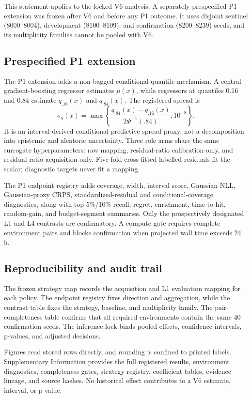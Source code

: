 \documentclass[10pt]{article}
\begin{document}
This statement applies to the locked V6 analysis. A separately prespecified
P1 extension was frozen after V6 and before any P1 outcome. It uses disjoint
sentinel (8000--8004), development (8100--8109), and confirmation
(8200--8239) seeds, and its multiplicity families cannot be pooled with V6.

\subsection{Prespecified P1 extension}
The P1 extension adds a non-bagged conditional-quantile mechanism. A central
gradient-boosting regressor estimates $\mu(x)$, while regressors at quantiles
0.16 and 0.84 estimate $q_{.16}(x)$ and $q_{.84}(x)$. The registered spread is
\begin{equation}
 \sigma_q(x)=\max\left\{\frac{q_{.84}(x)-q_{.16}(x)}
 {2\Phi^{-1}(.84)},10^{-8}\right\}.
\end{equation}
It is an interval-derived conditional predictive-spread proxy, not a
decomposition into epistemic and aleatoric uncertainty. Three role arms share
the same surrogate hyperparameters: raw mapping, residual-ratio
calibration-only, and residual-ratio acquisition-only. Five-fold cross-fitted
labelled residuals fit the scalar; diagnostic targets never fit a mapping.

The P1 endpoint registry adds coverage, width, interval score, Gaussian NLL,
Gaussian-proxy CRPS, standardized-residual and conditional-coverage
diagnostics, along with top-5\%/10\% recall, regret, enrichment, time-to-hit,
random-gain, and budget-segment summaries. Only the prospectively designated
L1 and L4 contrasts are confirmatory. A compute gate requires complete
environment pairs and blocks confirmation when projected wall time exceeds
24 h.

\subsection{Reproducibility and audit trail}
The frozen strategy map records the acquisition and L1 evaluation mapping for
each policy. The endpoint registry fixes direction and aggregation, while the
contrast table fixes the strategy, baseline, and multiplicity family. The
pair-completeness table confirms that all required environments contain the
same 40 confirmation seeds. The inference lock binds pooled effects,
confidence intervals, p-values, and adjusted decisions.

Figures read stored rows directly, and rounding is confined to printed
labels. Supplementary Information provides the full registered results,
environment diagnostics, completeness gates, strategy registry, coefficient
tables, evidence lineage, and source hashes. No historical effect contributes
to a V6 estimate, interval, or p-value.
\end{document}
